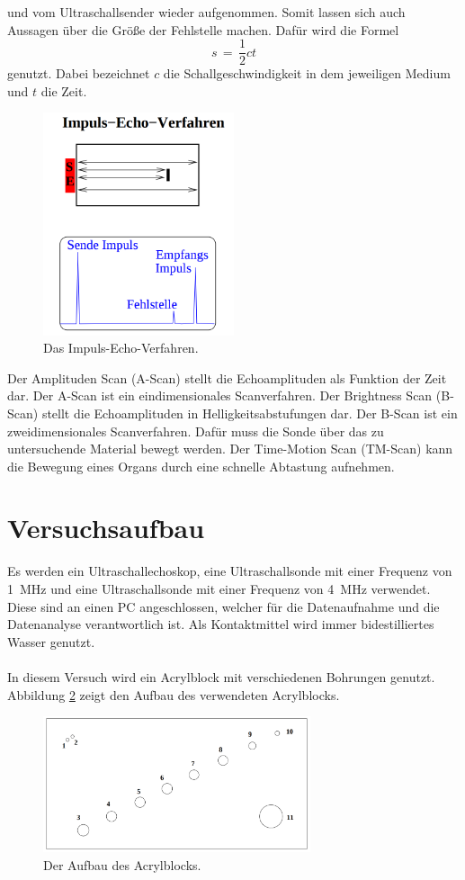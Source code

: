 \documentclass[
  bibliography=totoc,     %
  captions=tableheading,  %
  titlepage=firstiscover, %
]{scrartcl}
\begin{document}
und vom Ultraschallsender wieder aufgenommen. Somit lassen sich auch Aussagen
über die Größe der Fehlstelle machen. Dafür wird die Formel
\begin{equation}
  s\,=\, \frac{1}{2} c t
  \label{eqn:strecke}
\end{equation}
genutzt. Dabei bezeichnet $c$ die Schallgeschwindigkeit in dem jeweiligen
Medium und $t$ die Zeit.
\begin{figure}[H]
  \centering
  \includegraphics[width=0.5\textwidth]{US23.png}
  \caption{Das Impuls-Echo-Verfahren. \cite{anleitung}}
  \label{fig:US23}
\end{figure}
\noindent
Der Amplituden Scan (A-Scan) stellt die Echoamplituden als Funktion der Zeit
dar. Der A-Scan ist ein eindimensionales Scanverfahren.
Der Brightness Scan (B-Scan) stellt die Echoamplituden in
Helligkeitsabstufungen dar. Der B-Scan ist ein zweidimensionales Scanverfahren.
Dafür muss die Sonde über das zu untersuchende Material bewegt werden.
Der Time-Motion Scan (TM-Scan) kann die Bewegung eines Organs durch eine
schnelle Abtastung aufnehmen.
\section{Versuchsaufbau}
\label{sec:aufbau}
Es werden ein Ultraschallechoskop, eine Ultraschallsonde mit einer Frequenz von
\SI{1}{\mega\hertz} und eine Ultraschallsonde mit einer Frequenz von
\SI{4}{\mega\hertz} verwendet. Diese sind an einen PC angeschlossen, welcher
für die Datenaufnahme und die Datenanalyse verantwortlich ist. Als
Kontaktmittel wird immer bidestilliertes Wasser genutzt.\\
\\
In diesem Versuch wird ein Acrylblock mit verschiedenen Bohrungen genutzt.
Abbildung \ref{fig:US21} zeigt den Aufbau des verwendeten Acrylblocks.
\begin{figure}[H]
  \centering
  \includegraphics[width=0.7\textwidth]{US21.png}
  \caption{Der Aufbau des Acrylblocks. \cite{anleitung}}
  \label{fig:US21}
\end{figure}
\end{document}
